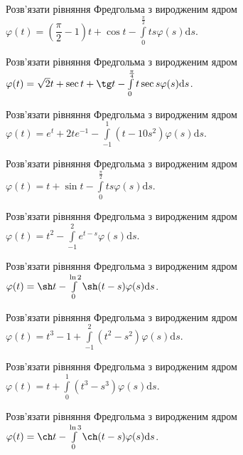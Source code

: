 \documentclass[12pt]{extarticle}
\begin{document}
\begin{Exercise}
Розв’язати рівняння Фредгольма з виродженим ядром $\varphi(t) = \left(\dfrac{\pi}{2}-1\right)t + \cos t - \int\limits_{0}^{\frac{\pi}{2}} ts \varphi(s) \mathrm{d}s$.
\end{Exercise}

\begin{Exercise}
Розв’язати рівняння Фредгольма з виродженим ядром $\varphi(t) = \sqrt{2} t + \sec t + \tg t - \int\limits_{0}^{\frac{\pi}{4}} t \sec s \varphi(s) \mathrm{d}s$.
\end{Exercise}

\begin{Exercise}
Розв’язати рівняння Фредгольма з виродженим ядром $\varphi(t) = e^t + 2te^{-1} - \int\limits_{-1}^{1} (t-10s^2) \varphi(s) \mathrm{d}s$.
\end{Exercise}

\begin{Exercise}
Розв’язати рівняння Фредгольма з виродженим ядром $\varphi(t) = t + \sin t - \int\limits_{0}^{\frac{\pi}{2}} ts \varphi(s) \mathrm{d}s$.
\end{Exercise}

\begin{Exercise}
Розв’язати рівняння Фредгольма з виродженим ядром $\varphi(t) = t^2 - \int\limits_{-1}^{2} e^{t-s} \varphi(s) \mathrm{d}s$.
\end{Exercise}

\begin{Exercise}
Розв’язати рівняння Фредгольма з виродженим ядром $\varphi(t) = \sh t - \int\limits_{0}^{\ln 2} \sh (t-s) \varphi(s) \mathrm{d}s$.
\end{Exercise}

\begin{Exercise}
Розв’язати рівняння Фредгольма з виродженим ядром $\varphi(t) = t^3 -1 + \int\limits_{-1}^{2} (t^2-s^2) \varphi(s) \mathrm{d}s$.
\end{Exercise}

\begin{Exercise}
Розв’язати рівняння Фредгольма з виродженим ядром $\varphi(t) = t + \int\limits_{0}^{1} (t^3-s^3) \varphi(s) \mathrm{d}s$.
\end{Exercise}

\begin{Exercise}
Розв’язати рівняння Фредгольма з виродженим ядром $\varphi(t) = \ch t - \int\limits_{0}^{\ln 3} \ch(t-s) \varphi(s) \mathrm{d}s$.
\end{Exercise}
\end{document}
